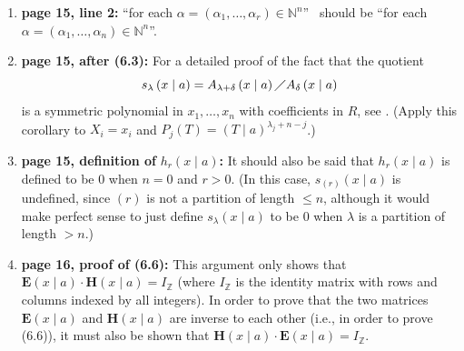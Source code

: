 \documentclass[numbers=enddot,12pt,final,onecolumn,notitlepage]{scrartcl}%
\theoremstyle{definition}
\begin{document}
\begin{enumerate}
\item \textbf{page 15, line 2:} \textquotedblleft for each $\alpha=\left(
\alpha_{1},\ldots,\alpha_{r}\right)  \in\mathbb{N}^{n}$\textquotedblright%
\ should be \textquotedblleft for each $\alpha=\left(  \alpha_{1}%
,\ldots,\alpha_{n}\right)  \in\mathbb{N}^{n}$\textquotedblright.

\item \textbf{page 15, after (6.3):} For a detailed proof of the fact that the
quotient
\[
s_{\lambda}\left(  x\mid a\right)  =A_{\lambda+\delta}\left(  x\mid a\right)
\diagup A_{\delta}\left(  x\mid a\right)
\]
is a symmetric polynomial in $x_{1},\ldots,x_{n}$ with coefficients in $R$,
see \cite[Corollary 9.14]{regpol}. (Apply this corollary to $X_{i}=x_{i}$ and
$P_{j}\left(  T\right)  =\left(  T\mid a\right)  ^{\lambda_{j}+n-j}$.)

\item \textbf{page 15, definition of }$h_{r}\left(  x\mid a\right)
$\textbf{:} It should also be said that $h_{r}\left(  x\mid a\right)  $ is
defined to be $0$ when $n=0$ and $r>0$. (In this case, $s_{\left(  r\right)
}\left(  x\mid a\right)  $ is undefined, since $\left(  r\right)  $ is not a
partition of length $\leq n$, although it would make perfect sense to just
define $s_{\lambda}\left(  x\mid a\right)  $ to be $0$ when $\lambda$ is a
partition of length $>n$.)

\item \textbf{page 16, proof of (6.6):} This argument only shows that
$\mathbf{E}\left(  x\mid a\right)  \cdot\mathbf{H}\left(  x\mid a\right)
=I_{\mathbb{Z}}$ (where $I_{\mathbb{Z}}$ is the identity matrix with rows and
columns indexed by all integers). In order to prove that the two matrices
$\mathbf{E}\left(  x\mid a\right)  $ and $\mathbf{H}\left(  x\mid a\right)  $
are inverse to each other (i.e., in order to prove (6.6)), it must also be
shown that $\mathbf{H}\left(  x\mid a\right)  \cdot\mathbf{E}\left(  x\mid
a\right)  =I_{\mathbb{Z}}$.


\end{enumerate}
\end{document}
